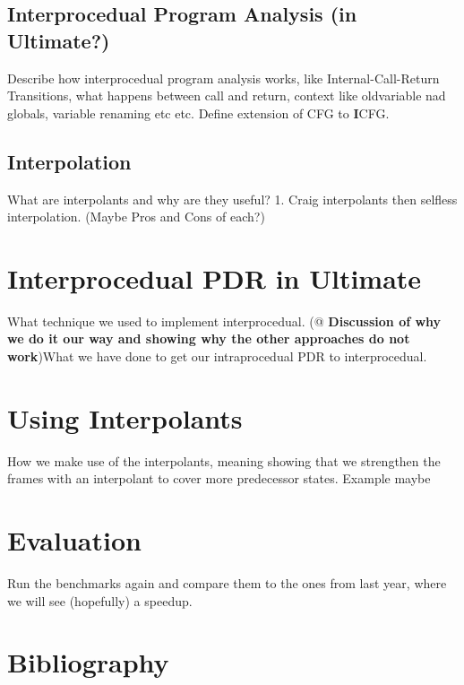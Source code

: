 \documentclass{article}
\begin{document}
	\subsection{Interprocedual Program Analysis (in Ultimate?)}
	Describe how interprocedual program analysis works, like Internal-Call-Return Transitions, what happens between call and return, context like oldvariable nad globals, variable renaming etc etc. Define extension of CFG to \textbf{I}CFG.
	
	\subsection{Interpolation}
	What are interpolants and why are they useful? 1. Craig interpolants then selfless interpolation.
	(Maybe Pros and Cons of each?)
	
	
	\section{Interprocedual PDR in Ultimate}
	What technique we used to implement interprocedual. (@ \textbf{Discussion of why we do it our way and showing why the other approaches do not work})What we have done to get our intraprocedual PDR to interprocedual.
	
	\section{Using Interpolants}
	How we make use of the interpolants, meaning showing that we strengthen the frames with an interpolant to cover more predecessor states. Example maybe
	
	\section{Evaluation}
	Run the benchmarks again and compare them to the ones from last year, where we will see (hopefully) a speedup.
	
	\section{Bibliography}

	
\end{document}
